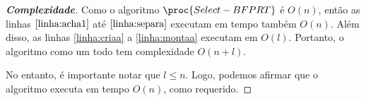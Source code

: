 \itemdsep{}

\begin{proof}[\textbf{Complexidade}]
    Como o algoritmo $\proc{Select-BFPRT}$ é $O(n)$, então as linhas $\ref{linha:acha1}$ até $\ref{linha:separa}$ executam em tempo também $O(n)$. Além disso, as linhas \ref{linha:criaa} a \ref{linha:montaa} executam em $O(l)$. Portanto, o algoritmo como um todo tem complexidade $O(n + l)$.

    No entanto, é importante notar que $l \leq n$. Logo, podemos afirmar que o algoritmo executa em tempo $O(n)$, como requerido.
\end{proof}

